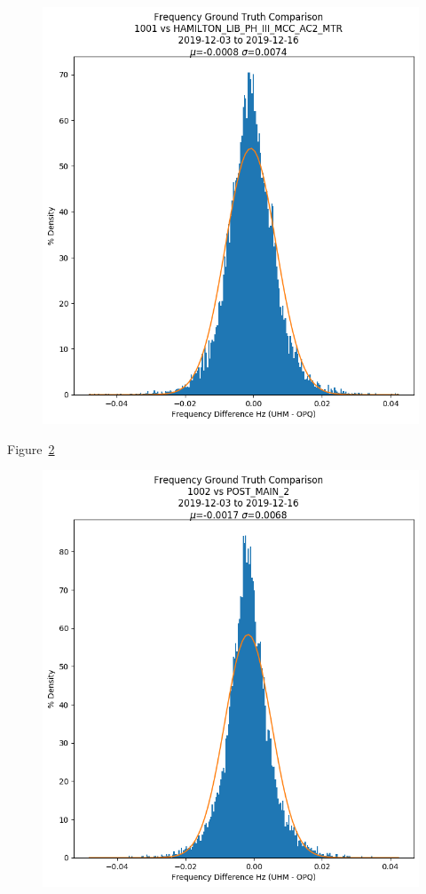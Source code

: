 \begin{figure}[H]
    \centering
    \includegraphics[width=\linewidth]{figures/f_hist_1001_HAMILTON_LIB_PH_III_MCC_AC2_MTR.png}
    \caption{}
    \label{fig:f_hist_1001_HAMILTON_LIB_PH_III_MCC_AC2_MTR}
\end{figure}

Figure~\ref{fig:f_hist_1002_POST_MAIN_2}

\begin{figure}[H]
    \centering
    \includegraphics[width=\linewidth]{figures/f_hist_1002_POST_MAIN_2.png}
    \caption{}
    \label{fig:f_hist_1002_POST_MAIN_2}
\end{figure}

